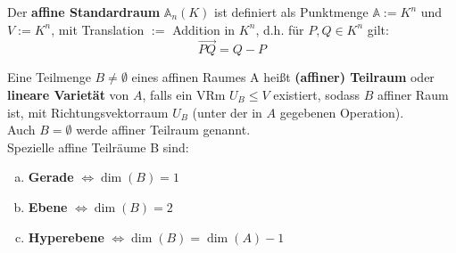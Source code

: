 \documentclass[parskip,a4paper,twoside,DIV15,BCOR12mm]{scrbook}
\begin{document}
\begin{comment}
\begin{enumerate}
\item Vorsicht in (1) wird das Zeichen "`+"' für verschiedene Verknüpfungen benutzt.
\item Es gilt für $P,Q,R,\in A:$
\begin{align*}
\overrightarrow{PP}&=0\\
\overrightarrow{PQ}+\overrightarrow{QR} &= \overrightarrow{PR}\\
\overrightarrow{QP}&=-\overrightarrow{PQ}
\end{align*} 
\item $A$ besteht aus genau einer Bahn:
\[\forall P\in A: A=V+P:=\{x+P\mid x\in V\}\]
\end{enumerate}
\end{comment}

\begin{example}
Der \textbf{affine Standardraum} $\mathbb{A}_n(K)$ ist definiert als  Punktmenge
$\mathbb{A}:=K^n$ und $V:=K^n$, mit Translation $:=$ Addition in $K^n$, d.h.
für $P,Q\in K^n$ gilt:
\[\overrightarrow{PQ}=Q-P\]
\end{example}

\begin{definition}
Eine Teilmenge $B \ne \emptyset$ eines affinen Raumes A heißt \textbf{(affiner) Teilraum}
oder \textbf{lineare Varietät} von $A$, falls ein VRm $U_B \le V$ existiert, sodass
$B$ affiner Raum ist, mit Richtungsvektorraum $U_B$ (unter der in $A$ gegebenen
Operation).\\
Auch $B = \emptyset$ werde affiner Teilraum genannt.\\
Spezielle affine Teilräume B sind:
\begin{enumerate}[(a)]
\item \textbf{Gerade} $\iff \dim(B) = 1$
\item \textbf{Ebene} $\iff \dim(B) = 2$
\item \textbf{Hyperebene} $\iff \dim(B) = \dim(A)-1$
\end{enumerate}
\end{definition}
\end{document}
